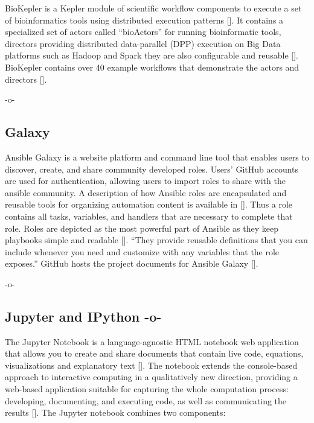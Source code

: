 BioKepler is a Kepler module of scientific workflow components to
execute a set of bioinformatics tools using distributed execution
patterns [\cite{www-biokepler}]. It contains a specialized set of actors
called ``bioActors'' for running bioinformatic tools, directors
providing distributed data-parallel (DPP) execution on Big Data
platforms such as Hadoop and Spark they are also configurable and
reusable [\cite{www-biokepler-demos}]. BioKepler contains over 40
example workflows that demonstrate the actors and
directors [\cite{bioActors}].

    -o-
    
\subsection{Galaxy}

Ansible Galaxy is a website platform and command line tool that
enables users to discover, create, and share community developed
roles. Users' GitHub accounts are used for authentication, allowing
users to import roles to share with the ansible community. A
description of how Ansible roles are encapsulated and reusable tools
for organizing automation content is available
in [\cite{www-galaxy-ansible}]. Thus a role contains all tasks,
variables, and handlers that are necessary to complete that
role. Roles are depicted as the most powerful part of Ansible as they
keep playbooks simple and readable [\cite{Ansible-book-2016}]. ``They
provide reusable definitions that you can include whenever you need
and customize with any variables that the role exposes.'' GitHub hosts
the project documents for Ansible Galaxy [\cite{www-github-galaxy}].


    -o-

\subsection{Jupyter and IPython -o-}

The Jupyter Notebook is a language-agnostic HTML notebook web
application that allows you to create and share documents that contain
live code, equations, visualizations and explanatory
text [\cite{www-jupyter-1}]. The notebook extends the console-based
approach to interactive computing in a qualitatively new direction,
providing a web-based application suitable for capturing the whole
computation process: developing, documenting, and executing code, as
well as communicating the results [\cite{www-jupyter-2}]. The Jupyter
notebook combines two components:
    
